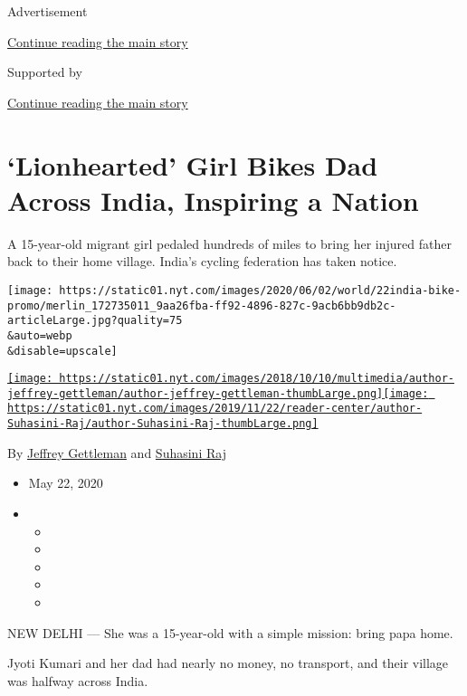 Advertisement

\protect\hyperlink{after-top}{Continue reading the main story}

Supported by

\protect\hyperlink{after-sponsor}{Continue reading the main story}

\hypertarget{lionhearted-girl-bikes-dad-across-india-inspiring-a-nation}{%
\section{`Lionhearted' Girl Bikes Dad Across India, Inspiring a
Nation}\label{lionhearted-girl-bikes-dad-across-india-inspiring-a-nation}}

A 15-year-old migrant girl pedaled hundreds of miles to bring her
injured father back to their home village. India's cycling federation
has taken notice.

\texttt{[image: https://static01.nyt.com/images/2020/06/02/world/22india-bike-promo/merlin\_172735011\_9aa26fba-ff92-4896-827c-9acb6bb9db2c-articleLarge.jpg?quality=75\\\&auto=webp\\\&disable=upscale]}

\href{https://www.nytimes.com/by/jeffrey-gettleman}{\texttt{[image: https://static01.nyt.com/images/2018/10/10/multimedia/author-jeffrey-gettleman/author-jeffrey-gettleman-thumbLarge.png]}}\href{https://www.nytimes.com/by/suhasini-raj}{\texttt{[image: https://static01.nyt.com/images/2019/11/22/reader-center/author-Suhasini-Raj/author-Suhasini-Raj-thumbLarge.png]}}

By \href{https://www.nytimes.com/by/jeffrey-gettleman}{Jeffrey
Gettleman} and \href{https://www.nytimes.com/by/suhasini-raj}{Suhasini
Raj}

\begin{itemize}
\item
  May 22, 2020
\item
  \begin{itemize}
  \item
  \item
  \item
  \item
  \item
  \end{itemize}
\end{itemize}

NEW DELHI --- She was a 15-year-old with a simple mission: bring papa
home.

Jyoti Kumari and her dad had nearly no money, no transport, and their
village was halfway across India.

